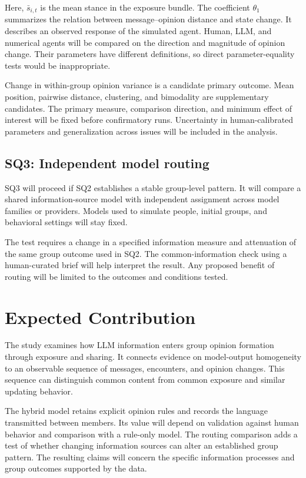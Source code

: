 \documentclass[11pt,a4paper]{article}
\begin{document}
Here, $\bar s_{i,t}$ is the mean stance in the exposure bundle. The coefficient $\theta_1$ summarizes the relation between message--opinion distance and state change. It describes an observed response of the simulated agent. Human, LLM, and numerical agents will be compared on the direction and magnitude of opinion change. Their parameters have different definitions, so direct parameter-equality tests would be inappropriate.

Change in within-group opinion variance is a candidate primary outcome. Mean position, pairwise distance, clustering, and bimodality are supplementary candidates. The primary measure, comparison direction, and minimum effect of interest will be fixed before confirmatory runs. Uncertainty in human-calibrated parameters and generalization across issues will be included in the analysis.

\subsection{SQ3: Independent model routing}

SQ3 will proceed if SQ2 establishes a stable group-level pattern. It will compare a shared information-source model with independent assignment across model families or providers. Models used to simulate people, initial groups, and behavioral settings will stay fixed.

The test requires a change in a specified information measure and attenuation of the same group outcome used in SQ2. The common-information check using a human-curated brief will help interpret the result. Any proposed benefit of routing will be limited to the outcomes and conditions tested.

\section{Expected Contribution}

The study examines how LLM information enters group opinion formation through exposure and sharing. It connects evidence on model-output homogeneity to an observable sequence of messages, encounters, and opinion changes. This sequence can distinguish common content from common exposure and similar updating behavior.

The hybrid model retains explicit opinion rules and records the language transmitted between members. Its value will depend on validation against human behavior and comparison with a rule-only model. The routing comparison adds a test of whether changing information sources can alter an established group pattern. The resulting claims will concern the specific information processes and group outcomes supported by the data.
\end{document}
